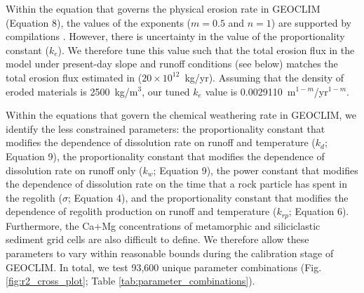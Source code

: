 \documentclass[11pt,letterpaper]{article}
\begin{document}
Within the equation that governs the physical erosion rate in GEOCLIM (Equation 8), the values of the exponents ($m=0.5$ and $n=1$) are supported by compilations \citep{Lague2013a}. However, there is uncertainty in the value of the proportionality constant ($k_e$). We therefore tune this value such that the total erosion flux in the model under present-day slope and runoff conditions (see below) matches the total erosion flux estimated in \citet{Milliman2013a} ($20\times10^{12}$~kg/yr). Assuming that the density of eroded materials is 2500~kg/m$^{3}$, our tuned $k_e$ value is 0.0029110~m$^{1-m}$/yr$^{1-m}$.

Within the equations that govern the chemical weathering rate in GEOCLIM, we identify the less constrained parameters: the proportionality constant that modifies the dependence of dissolution rate on runoff and temperature ($k_{d}$; Equation 9), the proportionality constant that modifies the dependence of dissolution rate on runoff only ($k_{w}$; Equation 9), the power constant that modifies the dependence of dissolution rate on the time that a rock particle has spent in the regolith ($\sigma$; Equation 4), and the proportionality constant that modifies the dependence of regolith production on runoff and temperature ($k_{rp}$; Equation 6). Furthermore, the Ca+Mg concentrations of metamorphic and siliciclastic sediment grid cells are also difficult to define. We therefore allow these parameters to vary within reasonable bounds during the calibration stage of GEOCLIM. In total, we test 93,600 unique parameter combinations (Fig. \ref{fig:r2_cross_plot}; Table \ref{tab:parameter_combinations}).
\end{document}
